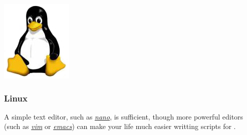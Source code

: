 \begin{flushleft}
	\begin{minipage}[c]{0.074\textwidth}
   		\includegraphics[width=\textwidth]{figures/figLogoLinux.jpg}
	\end{minipage}
	\quad
	\begin{minipage}[t]{0.88\textwidth}
	   	\subsubsection{Linux} 
	\end{minipage}

    A simple text editor, such as \href{http://www.nano-editor.org/}{\emph{nano}}, is sufficient, though more powerful
    editors (such as \href{http://www.vim.org}{\emph{vim}} or
    \href{http://www.gnu.org/software/emacs/}{\emph{emacs}}) can make your life much
    easier writting scripts for \poy.

\end{flushleft}

